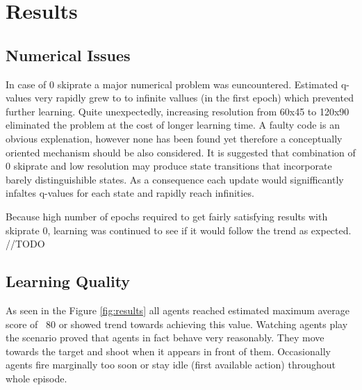 \section{Results}
	\subsection{Numerical Issues}
		In case of 0 skiprate a major numerical problem was euncountered. Estimated q-values very rapidly grew to to infinite vallues (in the first epoch) which prevented further learning. Quite unexpectedly, increasing resolution from 60x45 to 120x90 eliminated the problem at the cost of longer learning time. A faulty code is an obvious explenation, however none has been found yet therefore a conceptually oriented mechanism should be also considered. It is suggested that combination of 0 skiprate and low resolution may produce state transitions that incorporate barely distinguishible states. As a consequence each update would signifficantly infaltes q-values for each state and rapidly reach infinities.

		Because high number of epochs required to get fairly satisfying results with skiprate 0, learning was continued to see if it would follow the trend as expected. //TODO

	\subsection{Learning Quality}
		As seen in the Figure \ref{fig:results} all agents reached estimated maximum average score of ~80 or showed trend towards achieving this value. Watching agents play the scenario proved that agents in fact behave very reasonably. They move towards the target and shoot when it appears in front of them. Occasionally agents fire marginally too soon or stay idle (first available action) throughout whole episode. 

